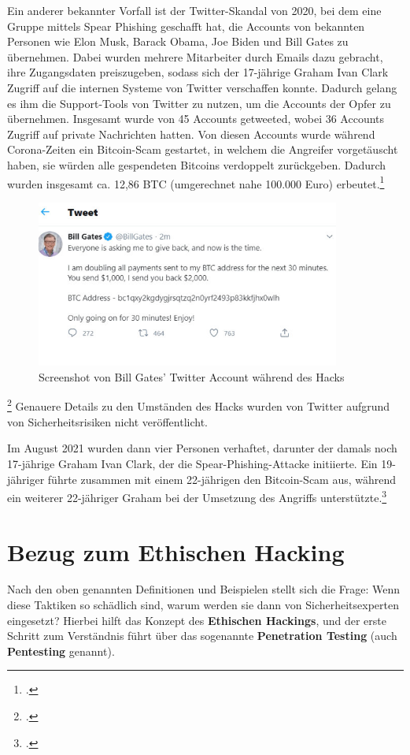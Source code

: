 \documentclass[12pt, a4paper, oneside]{scrartcl}
\begin{document}
Ein anderer bekannter Vorfall ist der Twitter-Skandal von 2020, bei dem eine Gruppe mittels Spear Phishing geschafft
hat, die Accounts von bekannten Personen wie Elon Musk, Barack Obama, Joe Biden und Bill Gates zu übernehmen.
Dabei wurden mehrere Mitarbeiter durch Emails dazu gebracht, ihre Zugangsdaten preiszugeben, sodass sich 
der 17-jährige Graham Ivan Clark Zugriff auf die internen Systeme von Twitter verschaffen konnte. Dadurch gelang
es ihm die Support-Tools von Twitter zu nutzen, um die Accounts der Opfer zu übernehmen. Insgesamt wurde von 45 Accounts
getweeted, wobei 36 Accounts Zugriff auf private Nachrichten hatten. Von diesen Accounts wurde während Corona-Zeiten 
ein Bitcoin-Scam gestartet, in welchem die Angreifer vorgetäuscht haben, sie würden alle gespendeten Bitcoins verdoppelt
zurückgeben. Dadurch wurden insgesamt ca. 12,86 BTC (umgerechnet nahe 100.000 Euro) erbeutet.\footcite{teampw_TwitterPhishing}\\

\begin{figure}[h!]
  \centering
  \includegraphics[width=10cm]{bill_hack.png}
  \caption[Screenshot von Bill Gates' Twitter Account während des Hacks]{Screenshot von Bill Gates' Twitter Account während des Hacks\footnotemark}
\end{figure}
\footcitetext{PicTwitterHack}
Genauere Details zu den Umständen des Hacks wurden von Twitter aufgrund von Sicherheitsrisiken nicht veröffentlicht. 
\par
Im August 2021 wurden dann vier Personen verhaftet, darunter der damals noch 17-jährige Graham Ivan Clark, 
der die Spear-Phishing-Attacke initiierte. Ein 19-jähriger führte zusammen mit einem 22-jährigen den 
Bitcoin-Scam aus, während ein weiterer 22-jähriger Graham bei der Umsetzung des Angriffs unterstützte.\footcite{teampw_TwitterPhishing}


\section{Bezug zum Ethischen Hacking}
Nach den oben genannten Definitionen und Beispielen stellt sich die Frage: Wenn diese Taktiken
so schädlich sind, warum werden sie dann von Sicherheitsexperten eingesetzt? Hierbei hilft das Konzept
des \textbf{Ethischen Hackings}, und der erste Schritt zum Verständnis führt über das sogenannte
\textbf{Penetration Testing} (auch \textbf{Pentesting} genannt).
\end{document}
